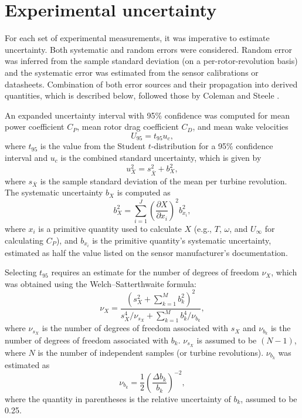 \section{Experimental uncertainty}


For each set of experimental measurements, it was imperative to estimate
uncertainty. Both systematic and random errors were considered. Random error was
inferred from the sample standard deviation (on a per-rotor-revolution basis)
and the systematic error was estimated from the sensor calibrations or
datasheets. Combination of both error sources and their propagation into derived
quantities, which is described below, followed those by Coleman and Steele
\cite{ColemanSteele}.

An expanded uncertainty interval with 95\% confidence was computed for mean
power coefficient $C_P$, mean rotor drag coefficient $C_D$, and mean wake
velocities
\begin{equation}
    U_{95} = t_{95} u_c,
\end{equation}
where $t_{95}$ is the value from the Student $t$-distribution for a 95\%
confidence interval and $u_c$ is the combined standard uncertainty, which is
given by
\begin{equation}
    u_X^2 = s_{\bar{X}}^2 + b_X^2,
\end{equation}
where $s_{\bar{X}}$ is the sample standard deviation of the mean per turbine
revolution. The systematic uncertainty $b_X$ is computed as
\begin{equation}
    b_{X}^2 = \sum_{i=1}^J \left( \frac{\partial X}{\partial x_i} \right)^2
    b_{x_i}^2,
\end{equation}
where $x_i$ is a primitive quantity used to calculate $X$ (e.g., $T$, $\omega$,
and $U_\infty$ for calculating $C_P$), and $b_{x_i}$ is the primitive quantity's
systematic uncertainty, estimated as half the value listed on the sensor
manufacturer's documentation.

Selecting $t_{95}$ requires an estimate for the number of degrees of freedom
$\nu_X$, which was obtained using the Welch--Satterthwaite formula:
\begin{equation}
    \nu_X = \frac{\left(s_X^2 + \sum_{k=1}^M b_k^2 \right)^2} {s_X^4/\nu_{s_X} +
    \sum_{k=1}^M b_k^4/\nu_{b_k}},
\end{equation}
where $\nu_{s_X}$ is the number of degrees of freedom associated with $s_X$ and
$\nu_{b_k}$ is the number of degrees of freedom associated with $b_k$.
$\nu_{s_X}$ is assumed to be $(N-1)$, where $N$ is the number of independent
samples (or turbine revolutions). $\nu_{b_k}$ was estimated as
\begin{equation}
    \nu_{b_k} = \frac{1}{2} \left( \frac{\Delta b_k}{b_k} \right)^{-2},
\end{equation}
where the quantity in parentheses is the relative uncertainty of $b_k$, assumed
to be 0.25.


